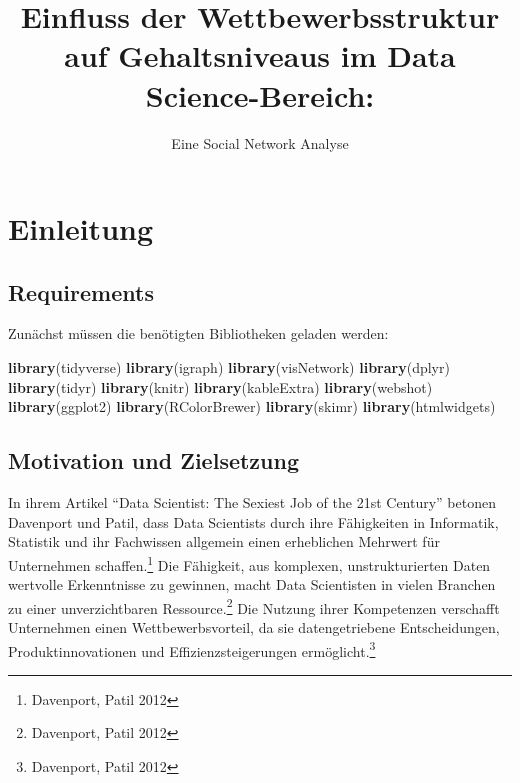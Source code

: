 \documentclass[
]{article}
\title{Einfluss der Wettbewerbsstruktur auf Gehaltsniveaus im Data
Science-Bereich:}
\subtitle{Eine Social Network Analyse}
\author{}
\date{\vspace{-2.5em}}
\newenvironment{Shaded}{\begin{snugshade}}{\end{snugshade}}
\newcommand{\FunctionTok}[1]{\textcolor[rgb]{0.13,0.29,0.53}{\textbf{#1}}}
\newcommand{\NormalTok}[1]{#1}
\begin{document}
\maketitle

{
\setcounter{tocdepth}{3}
\tableofcontents
}
\newpage

\section{Einleitung}\label{einleitung}

\subsection{Requirements}\label{requirements}

Zunächst müssen die benötigten Bibliotheken geladen werden:

\begin{Shaded}
\begin{Highlighting}[]
\FunctionTok{library}\NormalTok{(tidyverse)}
\FunctionTok{library}\NormalTok{(igraph)}
\FunctionTok{library}\NormalTok{(visNetwork)}
\FunctionTok{library}\NormalTok{(dplyr)}
\FunctionTok{library}\NormalTok{(tidyr)}
\FunctionTok{library}\NormalTok{(knitr)}
\FunctionTok{library}\NormalTok{(kableExtra)}
\FunctionTok{library}\NormalTok{(webshot)}
\FunctionTok{library}\NormalTok{(ggplot2)}
\FunctionTok{library}\NormalTok{(RColorBrewer)}
\FunctionTok{library}\NormalTok{(skimr)}
\FunctionTok{library}\NormalTok{(htmlwidgets)}
\end{Highlighting}
\end{Shaded}

\subsection{Motivation und
Zielsetzung}\label{motivation-und-zielsetzung}

In ihrem Artikel ``Data Scientist: The Sexiest Job of the 21st Century''
betonen Davenport und Patil, dass Data Scientists durch ihre Fähigkeiten
in Informatik, Statistik und ihr Fachwissen allgemein einen erheblichen
Mehrwert für Unternehmen schaffen.\footnote{Davenport, Patil 2012} Die
Fähigkeit, aus komplexen, unstrukturierten Daten wertvolle Erkenntnisse
zu gewinnen, macht Data Scientisten in vielen Branchen zu einer
unverzichtbaren Ressource.\footnote{Davenport, Patil 2012} Die Nutzung
ihrer Kompetenzen verschafft Unternehmen einen Wettbewerbsvorteil, da
sie datengetriebene Entscheidungen, Produktinnovationen und
Effizienzsteigerungen ermöglicht.\footnote{Davenport, Patil 2012}
\end{document}
